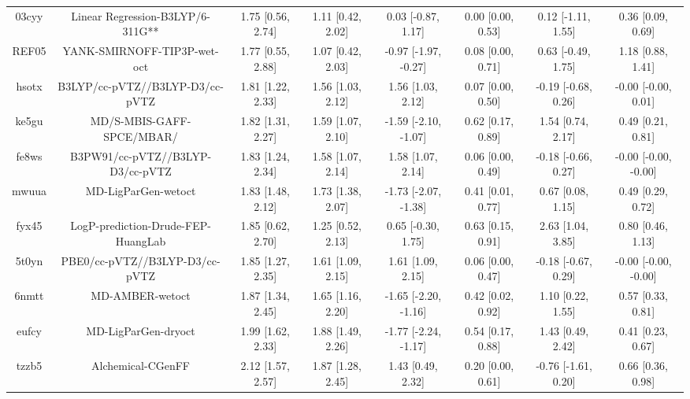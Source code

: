 \documentclass{article}
\begin{document}
\begin{center}
\begin{longtable}{|cccccccc|}
 03cyy &                   Linear Regression-B3LYP/6-311G** &  1.75 [0.56, 2.74] &  1.11 [0.42, 2.02] &    0.03 [-0.87, 1.17] &  0.00 [0.00, 0.53] &   0.12 [-1.11, 1.55] &     0.36 [0.09, 0.69] \\
 REF05 &                        YANK-SMIRNOFF-TIP3P-wet-oct &  1.77 [0.55, 2.88] &  1.07 [0.42, 2.03] &  -0.97 [-1.97, -0.27] &  0.08 [0.00, 0.71] &   0.63 [-0.49, 1.75] &     1.18 [0.88, 1.41] \\
 hsotx &                    B3LYP/cc-pVTZ//B3LYP-D3/cc-pVTZ &  1.81 [1.22, 2.33] &  1.56 [1.03, 2.12] &     1.56 [1.03, 2.12] &  0.07 [0.00, 0.50] &  -0.19 [-0.68, 0.26] &   -0.00 [-0.00, 0.01] \\
 ke5gu &                          MD/S-MBIS-GAFF-SPCE/MBAR/ &  1.82 [1.31, 2.27] &  1.59 [1.07, 2.10] &  -1.59 [-2.10, -1.07] &  0.62 [0.17, 0.89] &    1.54 [0.74, 2.17] &     0.49 [0.21, 0.81] \\
 fe8ws &                   B3PW91/cc-pVTZ//B3LYP-D3/cc-pVTZ &  1.83 [1.24, 2.34] &  1.58 [1.07, 2.14] &     1.58 [1.07, 2.14] &  0.06 [0.00, 0.49] &  -0.18 [-0.66, 0.27] &  -0.00 [-0.00, -0.00] \\
 mwuua &                                MD-LigParGen-wetoct &  1.83 [1.48, 2.12] &  1.73 [1.38, 2.07] &  -1.73 [-2.07, -1.38] &  0.41 [0.01, 0.77] &    0.67 [0.08, 1.15] &     0.49 [0.29, 0.72] \\
 fyx45 &                 LogP-prediction-Drude-FEP-HuangLab &  1.85 [0.62, 2.70] &  1.25 [0.52, 2.13] &    0.65 [-0.30, 1.75] &  0.63 [0.15, 0.91] &    2.63 [1.04, 3.85] &     0.80 [0.46, 1.13] \\
 5t0yn &                     PBE0/cc-pVTZ//B3LYP-D3/cc-pVTZ &  1.85 [1.27, 2.35] &  1.61 [1.09, 2.15] &     1.61 [1.09, 2.15] &  0.06 [0.00, 0.47] &  -0.18 [-0.67, 0.29] &  -0.00 [-0.00, -0.00] \\
 6nmtt &                                    MD-AMBER-wetoct &  1.87 [1.34, 2.45] &  1.65 [1.16, 2.20] &  -1.65 [-2.20, -1.16] &  0.42 [0.02, 0.92] &    1.10 [0.22, 1.55] &     0.57 [0.33, 0.81] \\
 eufcy &                                MD-LigParGen-dryoct &  1.99 [1.62, 2.33] &  1.88 [1.49, 2.26] &  -1.77 [-2.24, -1.17] &  0.54 [0.17, 0.88] &    1.43 [0.49, 2.42] &     0.41 [0.23, 0.67] \\
 tzzb5 &                                  Alchemical-CGenFF &  2.12 [1.57, 2.57] &  1.87 [1.28, 2.45] &     1.43 [0.49, 2.32] &  0.20 [0.00, 0.61] &  -0.76 [-1.61, 0.20] &     0.66 [0.36, 0.98] \\

\end{longtable}
\end{center}
\end{document}
